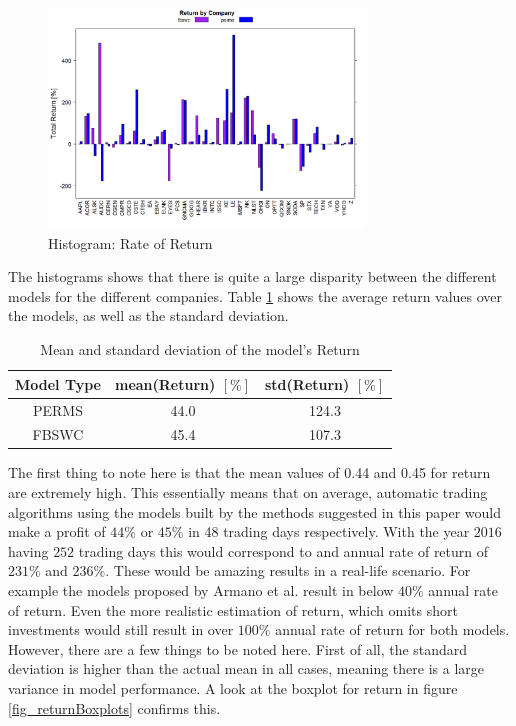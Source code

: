 \begin{figure}[h]
	\centering
  	\includegraphics[width=0.75\textwidth]{firstRunReturnByCompany}
	\caption{Histogram: Rate of Return}
	\label{fig_firstRunReturnByCompany}
\end{figure}

The histograms shows that there is quite a large disparity between the different models for the different companies. Table \ref{table_firstRunReturn} shows the average return values over the models, as well as the standard deviation.

\begin{table}	
\caption{Mean and standard deviation of the model's Return\label{table_firstRunReturn}}
\begin{tabular}{ c | c | c }		
  Model Type & mean(Return)  $[\%]$ & std(Return) $[\%]$ \\
  \hline
  PERMS & 44.0 & 124.3 \\
  FBSWC & 45.4 & 107.3 \\
\end{tabular}
\end{table}

 The first thing to note here is that the mean values of 0.44 and 0.45 for return are extremely high. This essentially means that on average, automatic trading algorithms using the models built by the methods suggested in this paper would make a profit of $44\%$ or $45\%$ in 48 trading days respectively. With the year $2016$ having $252$ trading days this would correspond to and annual rate of return of $231\%$ and $236\%$. These would be amazing results in a real-life scenario. For example the models proposed by Armano et al. \cite{armano2005hybrid} result in below $40\%$ annual rate of return. Even the more realistic estimation of return, which omits short investments would still result in over $100\%$ annual rate of return for both models. However, there are a few things to be noted here. First of all, the standard deviation is higher than the actual mean in all cases, meaning there is a large variance in model performance. A look at the boxplot for return in figure \ref{fig_returnBoxplots} confirms this.
 
